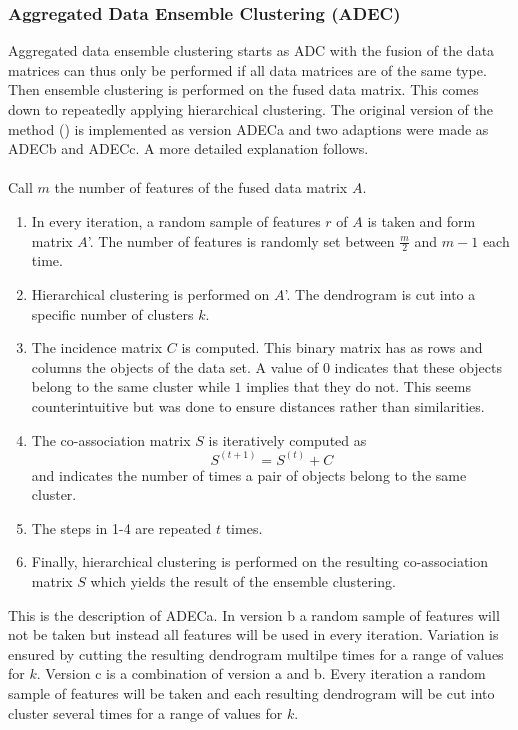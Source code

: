 \documentclass[a4paper]{article}
\begin{document}
\subsubsection{Aggregated Data Ensemble Clustering (ADEC)}
Aggregated data ensemble clustering starts as ADC with the
fusion of the data matrices can thus only be performed if all data matrices are
of the same type. Then ensemble clustering is performed on the fused data
matrix. This comes down to repeatedly applying hierarchical clustering. The
original version of the method (\cite{Fodeh2013}) is implemented as version
ADECa and two adaptions were made as ADECb and ADECc. A more detailed
explanation follows.\\ \\
Call $m$ the number of features of the fused data matrix $A$.
\begin{enumerate}
\item In every iteration, a random sample of features $r$ of $A$ is taken and
form matrix $A$'. The number of features is randomly set between $\frac{m}{2}$
and $m-1$ each time.
\item Hierarchical clustering is performed on $A$'. The dendrogram is cut into a
specific number of clusters $k$.
\item The incidence matrix $C$ is computed. This binary matrix has as rows and
columns the objects of the data set. A value of $0$ indicates that these
objects belong to the same cluster while $1$ implies that they do not. This
seems counterintuitive but was done to ensure distances rather than
similarities.
\item The co-association matrix $S$ is iteratively computed as
$$S^{(t+1)}=S^{(t)}+C$$ and indicates the number of times a pair of objects
belong to the same cluster.
\item The steps in 1-4 are repeated $t$ times.
\item Finally, hierarchical clustering is performed on the resulting
co-association matrix $S$ which yields the result of the ensemble clustering.
\end{enumerate}
\noindent This is the description of ADECa. In version b a random sample of
features will not be taken but instead all features will be used in every
iteration. Variation is ensured by cutting the resulting dendrogram multilpe
times for a range of values for $k$. Version c is a combination of version a and
b. Every iteration a random sample of features will be taken and each resulting
dendrogram will be cut into cluster several times for a range of values for $k$.
\end{document}
